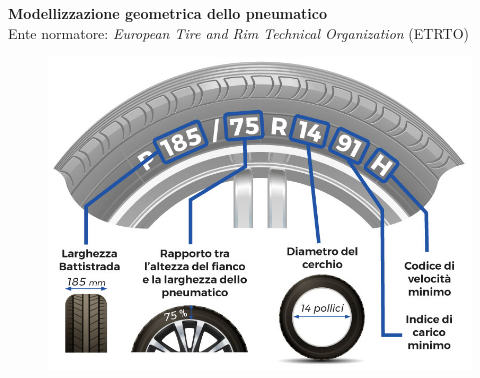 \documentclass[xcolor=dvipsnames]{beamer} %
\begin{document}
\begin{frame}
	\Large{\textbf{Modellizzazione geometrica dello pneumatico}}\\
	\normalsize
	Ente normatore: \textit{European Tire and Rim Technical Organization} (ETRTO)
	\begin{figure}
		\centering
		\includegraphics[width=0.7\linewidth]{../Figures/tire_measures}
	\end{figure}
\end{frame}
\end{document}
